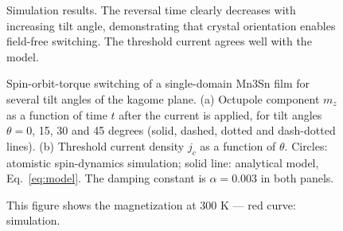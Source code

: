 \documentclass{article}
\begin{document}
\begin{figure}
\caption{Simulation results. The reversal time clearly decreases with increasing tilt angle, demonstrating that crystal orientation enables field-free switching. The threshold current agrees well with the model.}
\label{fig:before}
\end{figure}

\begin{figure}
\caption{Spin-orbit-torque switching of a single-domain Mn3Sn film for several tilt angles of the kagome plane. (a) Octupole component $m_z$ as a function of time $t$ after the current is applied, for tilt angles $\theta = 0$, 15, 30 and 45 degrees (solid, dashed, dotted and dash-dotted lines). (b) Threshold current density $j_c$ as a function of $\theta$. Circles: atomistic spin-dynamics simulation; solid line: analytical model, Eq.~\eqref{eq:model}. The damping constant is $\alpha = 0.003$ in both panels.}
\label{fig:after}
\end{figure}

\begin{figure}
\caption{This figure shows the magnetization at 300 K — red curve: simulation.}
\label{fig:colour}
\end{figure}
\end{document}
